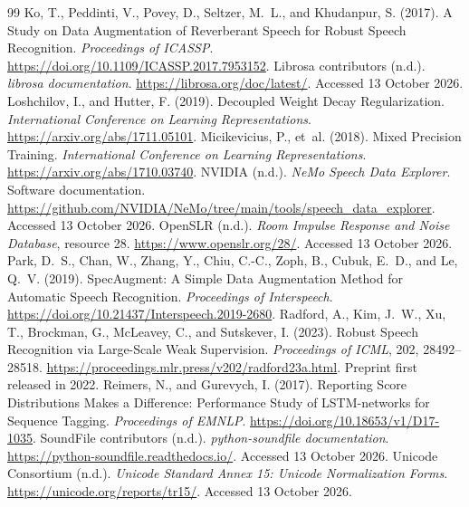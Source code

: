 \documentclass[12pt,a4paper]{report}
\begin{document}
\begin{thebibliography}{99}
 Ko, T., Peddinti, V., Povey, D., Seltzer, M.~L., and Khudanpur, S. (2017). A Study on Data Augmentation of Reverberant Speech for Robust Speech Recognition. \emph{Proceedings of ICASSP}. \url{https://doi.org/10.1109/ICASSP.2017.7953152}.
 Librosa contributors (n.d.). \emph{librosa documentation}. \url{https://librosa.org/doc/latest/}. Accessed 13 October 2026.
 Loshchilov, I., and Hutter, F. (2019). Decoupled Weight Decay Regularization. \emph{International Conference on Learning Representations}. \url{https://arxiv.org/abs/1711.05101}.
 Micikevicius, P., et~al. (2018). Mixed Precision Training. \emph{International Conference on Learning Representations}. \url{https://arxiv.org/abs/1710.03740}.
 NVIDIA (n.d.). \emph{NeMo Speech Data Explorer}. Software documentation. \url{https://github.com/NVIDIA/NeMo/tree/main/tools/speech_data_explorer}. Accessed 13 October 2026.
 OpenSLR (n.d.). \emph{Room Impulse Response and Noise Database}, resource 28. \url{https://www.openslr.org/28/}. Accessed 13 October 2026.
 Park, D.~S., Chan, W., Zhang, Y., Chiu, C.-C., Zoph, B., Cubuk, E.~D., and Le, Q.~V. (2019). SpecAugment: A Simple Data Augmentation Method for Automatic Speech Recognition. \emph{Proceedings of Interspeech}. \url{https://doi.org/10.21437/Interspeech.2019-2680}.
 Radford, A., Kim, J.~W., Xu, T., Brockman, G., McLeavey, C., and Sutskever, I. (2023). Robust Speech Recognition via Large-Scale Weak Supervision. \emph{Proceedings of ICML}, 202, 28492--28518. \url{https://proceedings.mlr.press/v202/radford23a.html}. Preprint first released in 2022.
 Reimers, N., and Gurevych, I. (2017). Reporting Score Distributions Makes a Difference: Performance Study of LSTM-networks for Sequence Tagging. \emph{Proceedings of EMNLP}. \url{https://doi.org/10.18653/v1/D17-1035}.
 SoundFile contributors (n.d.). \emph{python-soundfile documentation}. \url{https://python-soundfile.readthedocs.io/}. Accessed 13 October 2026.
 Unicode Consortium (n.d.). \emph{Unicode Standard Annex 15: Unicode Normalization Forms}. \url{https://unicode.org/reports/tr15/}. Accessed 13 October 2026.
\end{thebibliography}
\end{document}
